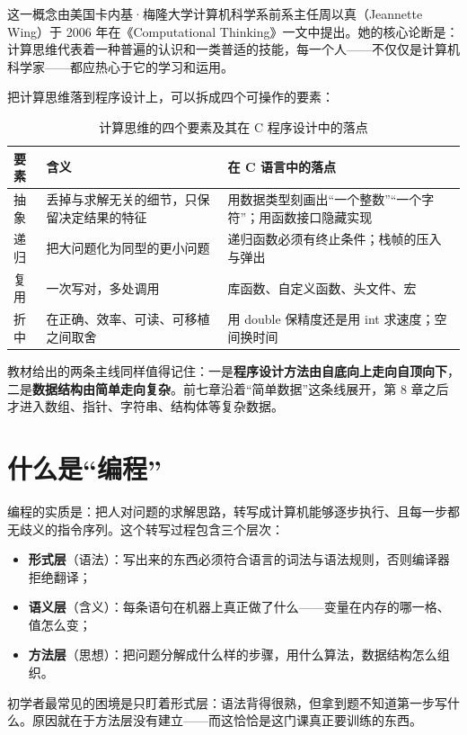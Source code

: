 这一概念由美国卡内基·梅隆大学计算机科学系前系主任周以真（Jeannette Wing）于 2006 年在《Computational Thinking》一文中提出。她的核心论断是：计算思维代表着一种普遍的认识和一类普适的技能，每一个人——不仅仅是计算机科学家——都应热心于它的学习和运用。

把计算思维落到程序设计上，可以拆成四个可操作的要素：

\begin{table}[htbp]
\centering
\caption{计算思维的四个要素及其在 C 程序设计中的落点}
\small
\begin{tabularx}{\textwidth}{@{}lXl@{}}
\toprule
要素 & 含义 & 在 C 语言中的落点 \\
\midrule
抽象 & 丢掉与求解无关的细节，只保留决定结果的特征 & 用数据类型刻画出“一个整数”“一个字符”；用函数接口隐藏实现 \\
递归 & 把大问题化为同型的更小问题 & 递归函数必须有终止条件；栈帧的压入与弹出 \\
复用 & 一次写对，多处调用 & 库函数、自定义函数、头文件、宏 \\
折中 & 在正确、效率、可读、可移植之间取舍 & 用 double 保精度还是用 int 求速度；空间换时间 \\
\bottomrule
\end{tabularx}
\end{table}

教材给出的两条主线同样值得记住：一是\textbf{程序设计方法由自底向上走向自顶向下}，二是\textbf{数据结构由简单走向复杂}。前七章沿着“简单数据”这条线展开，第 8 章之后才进入数组、指针、字符串、结构体等复杂数据。

\section{什么是“编程”}

编程的实质是：把人对问题的求解思路，转写成计算机能够逐步执行、且每一步都无歧义的指令序列。这个转写过程包含三个层次：

\begin{itemize}
  \item \textbf{形式层}（语法）：写出来的东西必须符合语言的词法与语法规则，否则编译器拒绝翻译；
  \item \textbf{语义层}（含义）：每条语句在机器上真正做了什么——变量在内存的哪一格、值怎么变；
  \item \textbf{方法层}（思想）：把问题分解成什么样的步骤，用什么算法，数据结构怎么组织。
\end{itemize}

初学者最常见的困境是只盯着形式层：语法背得很熟，但拿到题不知道第一步写什么。原因就在于方法层没有建立——而这恰恰是这门课真正要训练的东西。

